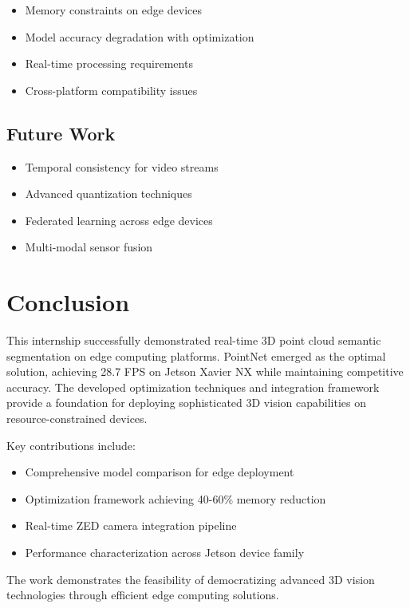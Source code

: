 \documentclass[12pt,a4paper]{report}
\begin{document}
\begin{itemize}
    \item Memory constraints on edge devices
    \item Model accuracy degradation with optimization
    \item Real-time processing requirements
    \item Cross-platform compatibility issues
\end{itemize}

\section{Future Work}

\begin{itemize}
    \item Temporal consistency for video streams
    \item Advanced quantization techniques
    \item Federated learning across edge devices
    \item Multi-modal sensor fusion
\end{itemize}

\chapter{Conclusion}

This internship successfully demonstrated real-time 3D point cloud semantic segmentation on edge computing platforms. PointNet emerged as the optimal solution, achieving 28.7 FPS on Jetson Xavier NX while maintaining competitive accuracy. The developed optimization techniques and integration framework provide a foundation for deploying sophisticated 3D vision capabilities on resource-constrained devices.

Key contributions include:
\begin{itemize}
    \item Comprehensive model comparison for edge deployment
    \item Optimization framework achieving 40-60\% memory reduction
    \item Real-time ZED camera integration pipeline
    \item Performance characterization across Jetson device family
\end{itemize}

The work demonstrates the feasibility of democratizing advanced 3D vision technologies through efficient edge computing solutions.
\end{document}
